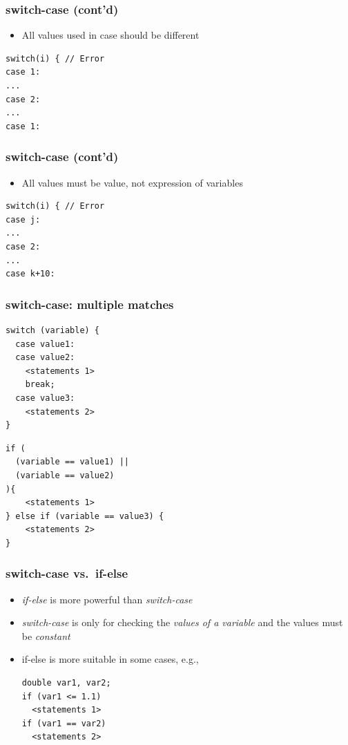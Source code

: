 \documentclass{../c-lecture}
\begin{document}
\begin{frame}[fragile]
  \frametitle{switch-case (cont’d)}
  \begin{itemize}
    \item All values used in case should be different
  \end{itemize}
  \begin{verbatim}
switch(i) { // Error
case 1:
...
case 2:
...
case 1:
  \end{verbatim}
\end{frame}

\begin{frame}[fragile]
  \frametitle{switch-case (cont’d)}
  \begin{itemize}
    \item All values must be value, not expression of variables
  \end{itemize}
  \scriptsize
  \begin{verbatim}
switch(i) { // Error
case j:
...
case 2:
...
case k+10:
  \end{verbatim}
\end{frame}

\begin{frame}[fragile]
  \frametitle{switch-case: multiple matches}
  \scriptsize
  \begin{verbatim}
switch (variable) {
  case value1:
  case value2:
    <statements 1>
    break;
  case value3:
    <statements 2>
}
  \end{verbatim}
  \scriptsize
  \begin{verbatim}
if (
  (variable == value1) ||
  (variable == value2)
){
    <statements 1>
} else if (variable == value3) {
    <statements 2>
}
  \end{verbatim}
\end{frame}

\begin{frame}[fragile]
  \frametitle{switch-case vs.\ if-else}
  \begin{itemize}
    \item
      \textit{\color{Orange} if-else} is more powerful than
      \textit{\color{Orange} switch-case}

    \item
      \textit{\color{LimeGreen} switch-case} is only for checking the
      \textit{\color{LimeGreen} values of a variable} and the values must be
      \textit{\color{LimeGreen} constant}

    \item if-else is more suitable in some cases, e.g.,
    \begin{verbatim}
double var1, var2;
if (var1 <= 1.1)
  <statements 1>
if (var1 == var2)
  <statements 2>
    \end{verbatim}
  \end{itemize}
\end{frame}
\end{document}
